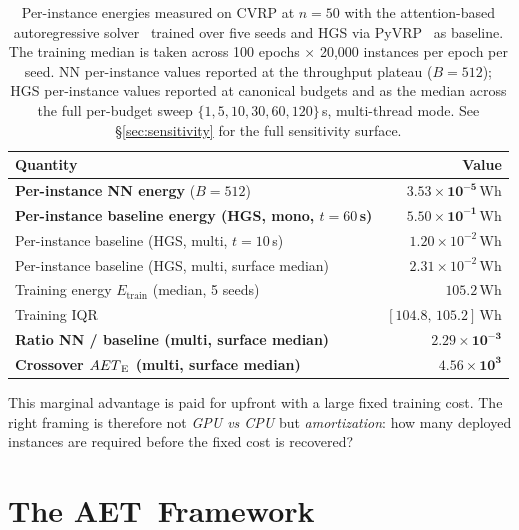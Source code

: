 \documentclass[11pt]{article}
\newcommand{\AET}{AET}
\newcommand{\AETE}{AET\textsubscript{E}}
\begin{document}
\begin{table}[t]
\centering \small
\begin{tabular}{lr}
\toprule
\textbf{Quantity} & \textbf{Value} \\
\midrule
\textbf{Per-instance NN energy} (\(B=512\)) & \(\boldsymbol{3.53\times10^{-5}\,\mathrm{Wh}}\) \\
\midrule
\textbf{Per-instance baseline energy (HGS, mono, \(t{=}60\)\,s)} & \(\boldsymbol{5.50\times10^{-1}\,\mathrm{Wh}}\) \\
Per-instance baseline (HGS, multi, \(t{=}10\)\,s) & \(1.20\times10^{-2}\,\mathrm{Wh}\) \\
Per-instance baseline (HGS, multi, surface median) & \(2.31\times10^{-2}\,\mathrm{Wh}\) \\
\midrule
Training energy \(E_\text{train}\) (median, 5 seeds) & \(105.2\,\mathrm{Wh}\) \\
Training IQR                              & \([104.8,\, 105.2]\,\mathrm{Wh}\) \\
\midrule
\textbf{Ratio NN / baseline (multi, surface median)} & \(\boldsymbol{2.29\times10^{-3}}\) \\
\textbf{Crossover \(\AETE\) (multi, surface median)} & \(\boldsymbol{4.56\times10^{3}}\) \\
\bottomrule
\end{tabular}
\caption{Per-instance energies measured on CVRP at \(n=50\) with the attention-based autoregressive solver~\cite{kool2019attention} trained over five seeds and HGS via PyVRP~\cite{vidal2022hgs,wouda2024pyvrp} as baseline. The training median is taken across 100 epochs $\times$ 20{,}000 instances per epoch per seed. NN per-instance values reported at the throughput plateau (\(B=512\)); HGS per-instance values reported at canonical budgets and as the median across the full per-budget sweep \(\{1,5,10,30,60,120\}\)\,s, multi-thread mode. See \S\ref{sec:sensitivity} for the full sensitivity surface.}
\label{tab:perinst}
\end{table}

This marginal advantage is paid for upfront with a large fixed training cost. The right framing is therefore not \emph{GPU vs CPU} but \emph{amortization}: how many deployed instances are required before the fixed cost is recovered?

\section{The \AET\ Framework}
\label{sec:framework}
\end{document}
